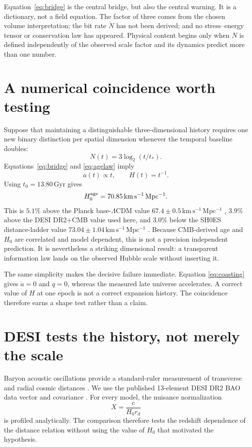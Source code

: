\documentclass[10pt,twocolumn]{article}
\newcommand{\LCDM}{$\Lambda$CDM}
\newcommand{\kmsmpc}{\mathrm{km\,s^{-1}\,Mpc^{-1}}}
\begin{document}
Equation~\eqref{eq:bridge} is the central bridge, but also the central warning.
It is a dictionary, not a field equation.  The factor of three comes from the
chosen volume interpretation; the bit rate $\dot N$ has not been derived; and
no stress--energy tensor or conservation law has appeared.  Physical content
begins only when $N$ is defined independently of the observed scale factor and
its dynamics predict more than one number.

\section{A numerical coincidence worth testing}

Suppose that maintaining a distinguishable three-dimensional history requires
one new binary distinction per spatial dimension whenever the temporal
baseline doubles:
\begin{equation}
 N(t)=3\log_2(t/t_*).
 \label{eq:agelaw}
\end{equation}
Equations~\eqref{eq:bridge} and \eqref{eq:agelaw} imply
\begin{equation}
 a(t)\propto t,\qquad H(t)=t^{-1}.
 \label{eq:coasting}
\end{equation}
Using $t_0=13.80\,\mathrm{Gyr}$ gives
\begin{equation}
 H_0^{\rm age}=70.85\,\kmsmpc.
\end{equation}
This is $5.1\%$ above the Planck base-\LCDM{} value
$67.4\pm0.5\,\kmsmpc$ \citep{Planck2018}, $3.9\%$ above the DESI
DR2+CMB value used here, and $3.0\%$ below the SH0ES distance-ladder value
$73.04\pm1.04\,\kmsmpc$ \citep{Riess2022}.  Because CMB-derived age and
$H_0$ are correlated and model dependent, this is not a precision independent
prediction.  It is nevertheless a striking dimensional result: a transparent
information law lands on the observed Hubble scale without inserting it.

The same simplicity makes the decisive failure immediate.  Equation
\eqref{eq:coasting} gives $\ddot a=0$ and $q=0$, whereas the measured late
universe accelerates.  A correct value of $H$ at one epoch is not a correct
expansion history.  The coincidence therefore earns a shape test rather than a
claim.

\section{DESI tests the history, not merely the scale}

Baryon acoustic oscillations provide a standard-ruler measurement of transverse
and radial cosmic distances \citep{Eisenstein2005}.  We use the published
13-element DESI DR2 BAO data vector and covariance \citep{DESI2025}.  For every
model, the nuisance normalization
\begin{equation}
 X=\frac{c}{H_0r_d}
\end{equation}
is profiled analytically.  The comparison therefore tests the redshift
dependence of the distance relation without using the value of $H_0$ that
motivated the hypothesis.
\end{document}
